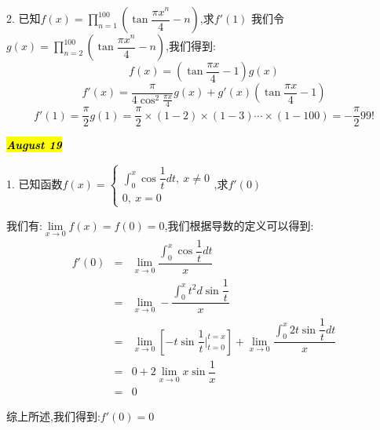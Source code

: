 2. 已知$f(x)=\prod\limits_{n=1}^{100}\left(\tan\dfrac{\pi x^n}{4}-n\right)$,求$f'(1)$
我们令$g(x)=\prod\limits_{n=2}^{100}\left(\tan\dfrac{\pi x^n}{4}-n\right)$,我们得到:$$f(x)=(\tan\dfrac{\pi x}{4}-1)g(x)$$
$$f'(x)=\dfrac{\pi}{4\cos^2\frac{\pi x}{4}}g(x)+g'(x)(\tan\dfrac{\pi x}{4}-1)$$
$$f'(1)=\dfrac{\pi}{2}g(1)=\dfrac{\pi}{2}\times(1-2)\times(1-3)\cdots\times(1-100)=-\dfrac{\pi}{2}99!$$

\hl{\textbf{\textit{August 19}}}

1. 已知函数$f(x)=\left\lbrace
\begin{array}{l}
	\int_{0}^{x}\cos\dfrac{1}{t}dt,\ x\neq 0\\
	0,\ x=0
\end{array}
\right. $,求$f'(0)$
\begin{solution}

	我们有:$\lim\limits_{x\rightarrow 0}f(x)=f(0)=0$,我们根据导数的定义可以得到:  
	\begin{eqnarray*}
		f'(0)&=&\lim\limits_{x\rightarrow 0}\dfrac{\int_{0}^{x}\cos\dfrac{1}{t}dt}{x}\\
		&=&\lim\limits_{x\rightarrow 0}-\dfrac{\int_{0}^{x}t^2d\sin\dfrac{1}{t}}{x}\\
		&=&\lim\limits_{x\rightarrow 0}\left[ -t\sin\dfrac{1}{t}|_{t=0}^{t=x}\right]+\lim\limits_{x\rightarrow 0}\dfrac{\int_{0}^{x}2t\sin\dfrac{1}{t}dt}{x}\\
		&=&0+2\lim\limits_{x\rightarrow 0}x\sin\dfrac{1}{x}\\
		&=&0
	\end{eqnarray*}

	综上所述,我们得到:$f'(0)=0$
\end{solution}

